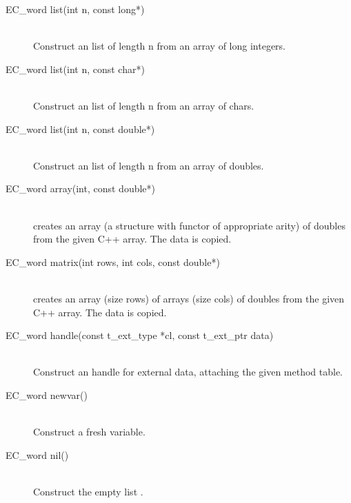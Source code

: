 \begin{description}
\item[EC_word list(int n, const long*)]\ \\
	Construct an {\eclipse} list of length n from an array of long integers.

\item[EC_word list(int n, const char*)]\ \\
	Construct an {\eclipse} list of length n from an array of chars.

\item[EC_word list(int n, const double*)]\ \\
	Construct an {\eclipse} list of length n from an array of doubles.

\item[EC_word array(int, const double*)]\ \\
	creates an {\eclipse} array (a structure with functor \nil of
	appropriate arity) of doubles from the given C++ array.
	The data is copied.

\item[EC_word matrix(int rows, int cols, const double*)]\ \\
	creates an {\eclipse} array (size rows) of arrays (size cols) of doubles
	from the given C++ array.  The data is copied.

\item[EC_word handle(const t_ext_type *cl, const t_ext_ptr data)]\ \\
	Construct an {\eclipse} handle for external data, attaching the
	given method table.

\item[EC_word newvar()]\ \\
	Construct a fresh {\eclipse} variable.

\item[EC_word nil()]\ \\
	Construct the empty list \nil.
\end{description}

